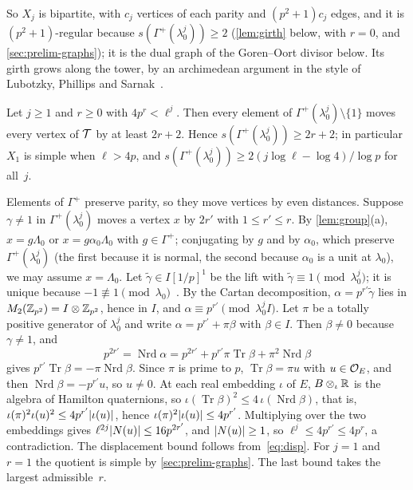 So $X_j$ is bipartite, with $c_j$ vertices of each parity and $(p^2+1)c_j$ edges, and it is $(p^2+1)$-regular because
$s(\Gamma^+(\lambda_0^j))\ge2$ (\cref{lem:girth} below, with $r=0$, and \cref{sec:prelim-graphs}); it is the dual graph
of the Goren--Oort divisor below. Its girth grows along the tower, by an archimedean argument in the style of
Lubotzky, Phillips and Sarnak~\cite{LPS1988}.

\begin{lemma}[Girth]\label{lem:girth}
\notformalized
Let $j\ge1$ and $r\ge0$ with $4p^r<\ell^j$. Then every element of $\Gamma^+(\lambda_0^j)\setminus\{1\}$ moves every
vertex of $\mathcal{T}$ by at least $2r+2$. Hence $s(\Gamma^+(\lambda_0^j))\ge2r+2$; in particular $X_1$ is simple when
$\ell>4p$, and $s(\Gamma^+(\lambda_0^j))\ge2(j\log\ell-\log4)/\log p$ for all~$j$.
\end{lemma}
\begin{informalproof}
Elements of $\Gamma^+$ preserve parity, so they move vertices by even distances. Suppose $\gamma\ne1$ in
$\Gamma^+(\lambda_0^j)$ moves a vertex $x$ by $2r'$ with $1\le r'\le r$. By \cref{lem:group}(a), $x=g\Lambda_0$ or
$x=g\alpha_0\Lambda_0$ with $g\in\Gamma^+$; conjugating by $g$ and by $\alpha_0$, which preserve $\Gamma^+(\lambda_0^j)$
(the first because it is normal, the second because $\alpha_0$ is a unit at $\lambda_0$), we may assume $x=\Lambda_0$.
Let $\tilde\gamma\in I[1/p]^1$ be the lift with $\tilde\gamma\equiv1\pmod{\lambda_0^j}$; it is unique because
$-1\not\equiv1\pmod{\lambda_0}$~\cite[Lemma~6.3]{Luck2026}. By the Cartan decomposition,
$\alpha=p^{r'}\tilde\gamma$ lies in $M_2(\mathbb{Z}_{p^2})=I\otimes\mathbb{Z}_{p^2}$, hence in $I$, and $\alpha\equiv p^{r'}\pmod{\lambda_0^jI}$.
Let $\pi$ be a totally positive generator of $\lambda_0^j$ and write $\alpha=p^{r'}+\pi\beta$ with $\beta\in I$. Then
$\beta\ne0$ because $\gamma\ne1$, and
\[
  p^{2r'}=\operatorname{Nrd}\alpha=p^{2r'}+p^{r'}\pi\operatorname{Tr}\beta+\pi^2\operatorname{Nrd}\beta
\]
gives $p^{r'}\operatorname{Tr}\beta=-\pi\operatorname{Nrd}\beta$. Since $\pi$ is prime to $p$, $\operatorname{Tr}\beta=\pi u$
with $u\in\mathcal{O}_E$, and then $\operatorname{Nrd}\beta=-p^{r'}u$, so $u\ne0$. At each real embedding $\iota$ of $E$,
$B\otimes_\iota\mathbb{R}$ is the algebra of Hamilton quaternions, so
$\iota(\operatorname{Tr}\beta)^2\le4\,\iota(\operatorname{Nrd}\beta)$, that is,
$\iota(\pi)^2\iota(u)^2\le4p^{r'}\lvert \iota(u) \rvert$, hence $\iota(\pi)^2\lvert \iota(u) \rvert\le4p^{r'}$. Multiplying over the two
embeddings gives $\ell^{2j}\lvert N(u) \rvert\le16p^{2r'}$, and $\lvert N(u) \rvert\ge1$, so $\ell^j\le4p^{r'}\le4p^r$, a contradiction.
The displacement bound follows from~\eqref{eq:disp}. For $j=1$ and $r=1$ the quotient is simple by
\cref{sec:prelim-graphs}. The last bound takes the largest admissible~$r$.
\end{informalproof}

